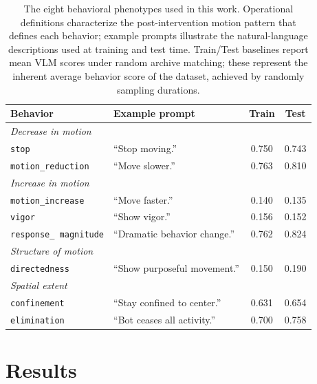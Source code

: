 \documentclass{article}
\begin{document}
\begin{table}[h]
\centering
\footnotesize
\caption{The eight behavioral phenotypes used in this work. Operational definitions characterize the post-intervention motion pattern that defines each behavior; example prompts illustrate the natural-language descriptions used at training and test time. Train/Test baselines report mean VLM scores under random archive matching; these represent the inherent average behavior score of the dataset, achieved by randomly sampling durations.}
\label{tab:behaviors}
\begin{tabular}{p{2.2cm}p{2.4cm}cc}
\toprule
Behavior & Example prompt & Train & Test \\
\midrule
\multicolumn{4}{l}{\textit{Decrease in motion}} \\
\midrule
\texttt{stop} & ``Stop moving.'' & 0.750 & 0.743 \\
\texttt{motion\_reduction} & ``Move slower.'' & 0.763 & 0.810 \\
\midrule
\multicolumn{4}{l}{\textit{Increase in motion}} \\
\midrule
\texttt{motion\_increase} & ``Move faster.'' & 0.140 & 0.135 \\
\texttt{vigor} & ``Show vigor.'' & 0.156 & 0.152 \\
\texttt{response\_ magnitude} & ``Dramatic behavior change.'' & 0.762 & 0.824 \\
\midrule
\multicolumn{4}{l}{\textit{Structure of motion}} \\
\midrule
\texttt{directedness} & ``Show purposeful movement.'' & 0.150 & 0.190 \\
\midrule
\multicolumn{4}{l}{\textit{Spatial extent}} \\
\midrule
\texttt{confinement} & ``Stay confined to center.'' & 0.631 & 0.654 \\
\texttt{elimination} & ``Bot ceases all activity.'' & 0.700 & 0.758 \\
\bottomrule
\end{tabular}
\end{table}

\section{Results}
\label{sec:results}

\end{document}
